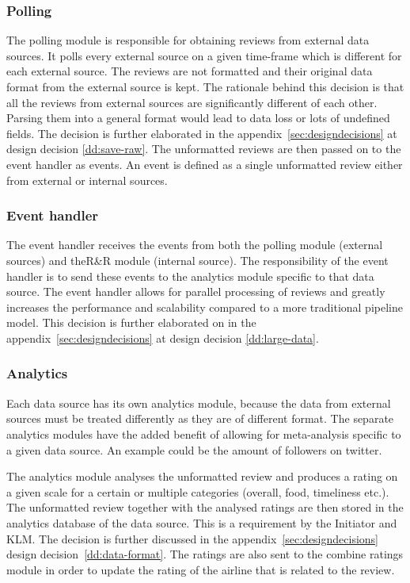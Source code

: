 \subsubsection{Polling}
The polling module is responsible for obtaining reviews from external data sources. It polls every external source on a given time-frame which is different for each external source. The reviews are not formatted and their original data format from the external source is kept. The rationale behind this decision is that all the reviews from external sources are significantly different of each other. Parsing them into a general format would lead to data loss or lots of undefined fields. The decision is further elaborated in the appendix~\ref{sec:designdecisions} at design decision \ref{dd:save-raw}. The unformatted reviews are then passed on to the event handler as events. An event is defined as a single unformatted review either from external or internal sources.

\subsubsection{Event handler}
The event handler receives the events from both the polling module (external sources) and theR\&R module (internal source). The responsibility of the event handler is to send these events to the analytics module specific to that data source. The event handler allows for parallel processing of reviews and greatly increases the performance and scalability compared to a more traditional pipeline model. This decision is further elaborated on in the appendix~\ref{sec:designdecisions} at design decision \ref{dd:large-data}.

\subsubsection{Analytics}
Each data source has its own analytics module, because the data  from external sources must be treated differently as they are of different format. The separate analytics modules have the added benefit of allowing for meta-analysis specific to a given data source. An example could be the amount of followers on twitter.

The analytics module analyses the unformatted review and produces a rating on a given scale for a certain or multiple categories (overall, food, timeliness etc.). The unformatted review together with the analysed ratings are then stored in the analytics database of the data source. This is a requirement by the Initiator and KLM. The decision is further discussed in the appendix~\ref{sec:designdecisions} design decision~\ref{dd:data-format}. The ratings are also sent to the combine ratings module in order to update the rating of the airline that is related to the review.

